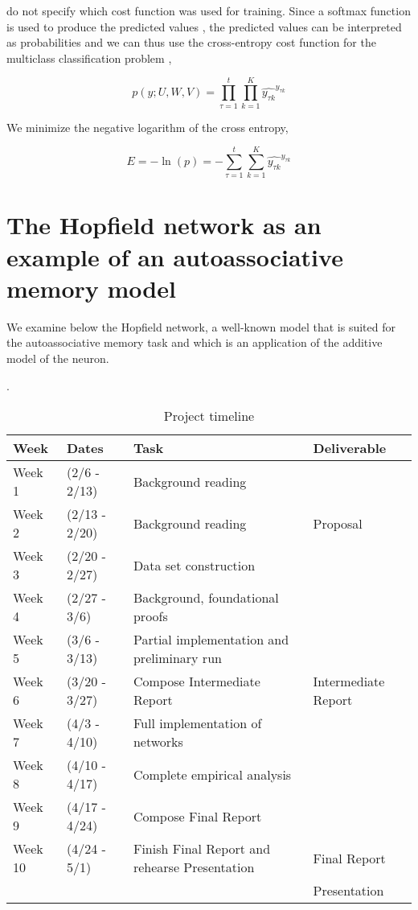 \citealt{DBLP:conf/nips/BaHMLI16} do not specify which cost function was used for training. Since a softmax function is used to produce the predicted values \cite[p. 5]{DBLP:conf/nips/BaHMLI16}, the predicted values can be interpreted as probabilities and we can thus use the cross-entropy cost function for the multiclass classification problem \cite{bishop2006pattern},

\begin{equation*}
p(y; U, W, V) = \prod_{\tau=1}^{t}\prod_{k=1}^{K}\widehat{y_{\tau k}}^{y_{\tau k}}
\end{equation*}

We minimize the negative logarithm of the cross entropy,

\begin{equation*}
E = -\ln(p) = -\sum_{\tau=1}^t \sum_{k=1}^K \widehat{y_{\tau k}}^{y_{\tau k}}
\end{equation*}

\section{The Hopfield network as an example of an autoassociative memory model}

We examine below the Hopfield network, a well-known model that is suited for the autoassociative memory task and which is an application of the additive model of the neuron.

\cite{Yegnanarayana:2004:ANN:1197006}.

\begin{table*}[t]
  \caption{Project timeline}
  \label{tab:freq}
  \begin{tabular}{llll}
    \toprule
    Week & Dates & Task & Deliverable\\
    \midrule
    Week 1 & (2/6   - 2/13) & Background reading & \\
    Week 2 & (2/13  - 2/20) & Background reading & Proposal\\
    Week 3 & (2/20  - 2/27) & Data set construction & \\
    Week 4 & (2/27  - 3/6)  & Background, foundational proofs & \\
    Week 5 & (3/6   - 3/13) & Partial implementation and preliminary run & \\
    Week 6 & (3/20  - 3/27) & Compose Intermediate Report & Intermediate Report\\
    Week 7 & (4/3   - 4/10) & Full implementation of networks & \\
    Week 8 & (4/10  - 4/17) & Complete empirical analysis & \\
    Week 9 & (4/17  - 4/24) & Compose Final Report & \\
    Week 10 & (4/24 - 5/1) & Finish Final Report and rehearse Presentation & Final Report \\
    & & & Presentation\\
  \bottomrule
\end{tabular}
\end{table*}

